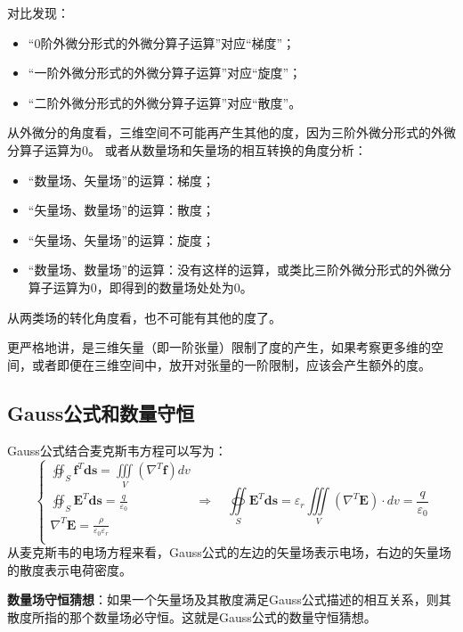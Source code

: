 对比发现：
\begin{itemize}
    \item “0阶外微分形式的外微分算子运算”对应“梯度”；
    \item “一阶外微分形式的外微分算子运算”对应“旋度”；
    \item “二阶外微分形式的外微分算子运算”对应“散度”。
\end{itemize}
从外微分的角度看，三维空间不可能再产生其他的度，因为三阶外微分形式的外微分算子运算为0。
或者从数量场和矢量场的相互转换的角度分析：
\begin{itemize}
    \item “数量场、矢量场”的运算：梯度；
    \item “矢量场、数量场”的运算：散度；
    \item “矢量场、矢量场”的运算：旋度；
    \item “数量场、数量场”的运算：没有这样的运算，或类比三阶外微分形式的外微分算子运算为0，即得到的数量场处处为0。
\end{itemize}
从两类场的转化角度看，也不可能有其他的度了。

\begin{tcolorbox}
更严格地讲，是三维矢量（即一阶张量）限制了度的产生，如果考察更多维的空间，或者即便在三维空间中，放开对张量的一阶限制，应该会产生额外的度。
\end{tcolorbox}

\subsection{Gauss公式和数量守恒}

Gauss公式结合麦克斯韦方程可以写为：
\[
\begin{cases}
	\oiint_S{\boldsymbol{f}^T\boldsymbol{ds}}=\iiint\limits_V{\left( \nabla ^T\boldsymbol{f} \right) dv}\\
	\oiint_S{\boldsymbol{E}^T\boldsymbol{ds}}=\frac{q}{\varepsilon _0}\\
	\nabla ^T\boldsymbol{E}=\frac{\rho}{\varepsilon _0\varepsilon _r}\\
\end{cases} \Rightarrow \quad \oiint\limits_S{\boldsymbol{E}^T\boldsymbol{ds}}=\varepsilon _r\iiint\limits_V{\left( \nabla ^T\boldsymbol{E} \right) \cdot dv}=\frac{q}{\varepsilon _0}
\]
从麦克斯韦的电场方程来看，Gauss公式的左边的矢量场表示电场，右边的矢量场的散度表示电荷密度。

\begin{tcolorbox}
{\bf 数量场守恒猜想}：如果一个矢量场及其散度满足Gauss公式描述的相互关系，则其散度所指的那个数量场必守恒。这就是Gauss公式的数量守恒猜想。
\end{tcolorbox}

